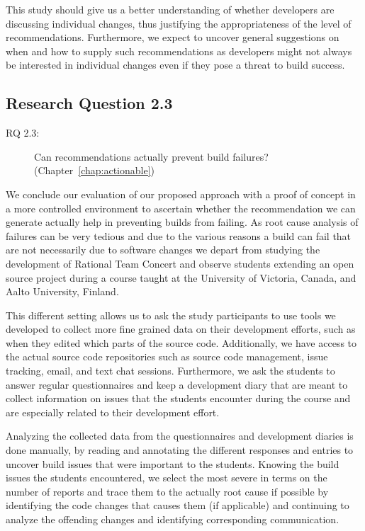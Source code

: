 This study should give us a better understanding of whether developers are discussing individual changes, thus justifying the appropriateness of the level of recommendations.
Furthermore, we expect to uncover general suggestions on when and how to supply such recommendations as developers might not always be interested in individual changes even if they pose a threat to build success.

\subsection{Research Question 2.3}
\begin{description}
  \item[RQ 2.3:] Can recommendations actually prevent build failures? (Chapter~\ref{chap:actionable})
\end{description}
We conclude our evaluation of our proposed approach with  a proof of concept in a more controlled environment to ascertain whether the recommendation we can generate actually help in preventing builds from failing.
As root cause analysis of failures can be very tedious and due to the various reasons a build can fail that are not necessarily due to software changes we depart from studying the development of Rational Team Concert and observe students extending an open source project during a course taught at the University of Victoria, Canada, and Aalto University, Finland.

This different setting allows us to ask the study participants to use tools we developed to collect more fine grained data on their development efforts, such as when they edited which parts of the source code.
Additionally, we have access to the actual source code repositories such as source code management, issue tracking, email, and text chat sessions.
Furthermore, we ask the students to answer regular questionnaires and keep a development diary that are meant to collect information on issues that the students encounter during the course and are especially related to their development effort.

Analyzing the collected data from the questionnaires and development diaries is done manually, by reading and annotating the different responses and entries to uncover build issues that were important to the students.
Knowing the build issues the students encountered, we select the most severe in terms on the number of reports and trace them to the actually root cause if possible by identifying the code changes that causes them (if applicable) and continuing to analyze the offending changes and identifying corresponding communication.

